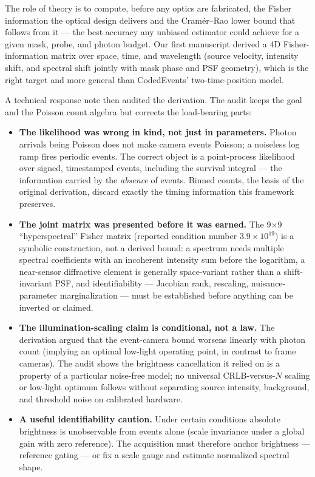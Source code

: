 \documentclass[11pt,a4paper]{article}
\begin{document}
The role of theory is to compute, before any optics are fabricated, the Fisher
information the optical design delivers and the Cram\'er--Rao lower bound that follows
from it --- the best accuracy any unbiased estimator could achieve for a given mask,
probe, and photon budget. Our first manuscript derived a 4D Fisher-information matrix
over space, time, and wavelength (source velocity, intensity shift, and spectral shift
jointly with mask phase and PSF geometry), which is the right target and more general
than CodedEvents' two-time-position model.

A technical response note then audited the derivation. The audit keeps the goal and
the Poisson count algebra but corrects the load-bearing parts:

\begin{itemize}
\item \textbf{The likelihood was wrong in kind, not just in parameters.} Photon
      arrivals being Poisson does not make camera events Poisson; a noiseless log
      ramp fires periodic events. The correct object is a point-process likelihood
      over signed, timestamped events, including the survival integral --- the
      information carried by the \emph{absence} of events. Binned counts, the basis
      of the original derivation, discard exactly the timing information this
      framework preserves.
\item \textbf{The joint matrix was presented before it was earned.} The 9$\times$9
      ``hyperspectral'' Fisher matrix (reported condition number
      $3.9 \times 10^{19}$) is a symbolic construction, not a derived bound: a
      spectrum needs multiple spectral coefficients with an incoherent intensity sum
      before the logarithm, a near-sensor diffractive element is generally
      space-variant rather than a shift-invariant PSF, and identifiability ---
      Jacobian rank, rescaling, nuisance-parameter marginalization --- must be
      established before anything can be inverted or claimed.
\item \textbf{The illumination-scaling claim is conditional, not a law.} The
      derivation argued that the event-camera bound worsens linearly with photon
      count (implying an optimal low-light operating point, in contrast to frame
      cameras). The audit shows the brightness cancellation it relied on is a
      property of a particular noise-free model; no universal CRLB-versus-$N$
      scaling or low-light optimum follows without separating source intensity,
      background, and threshold noise on calibrated hardware.
\item \textbf{A useful identifiability caution.} Under certain conditions absolute
      brightness is unobservable from events alone (scale invariance under a global
      gain with zero reference). The acquisition must therefore anchor brightness ---
      reference gating --- or fix a scale gauge and estimate normalized spectral
      shape.
\end{itemize}
\end{document}
